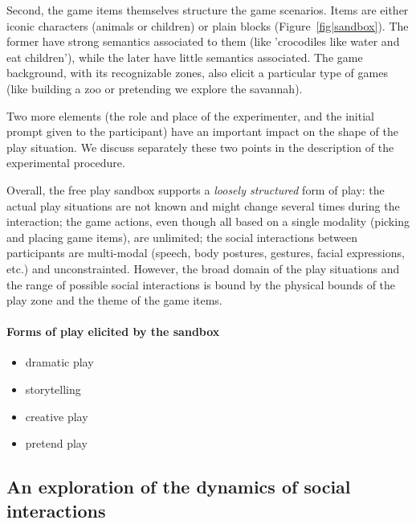 \documentclass[sigconf]{acmart}
\begin{document}
Second, the game items themselves structure the game scenarios. Items are either
iconic characters (animals or children) or plain blocks
(Figure~\ref{fig|sandbox}). The former have strong semantics associated to them
(like 'crocodiles like water and eat children'), while the later have little
semantics associated. The game background, with its recognizable zones, also
elicit a particular type of games (like building a zoo or pretending we explore
the savannah).

Two more elements (the role and place of the experimenter, and the initial
prompt given to the participant) have an important impact on the shape of the
play situation. We discuss separately these two points in the description of the
experimental procedure.

Overall, the free play sandbox supports a \emph{loosely structured} form of play: the
actual play situations are not known and might change several times during the
interaction; the game actions, even though all based on a single modality (picking and
placing game items), are unlimited; the social interactions between participants
are multi-modal (speech, body postures, gestures, facial expressions, etc.) and
unconstrainted. However, the broad domain of the play situations and the range of
possible social interactions is bound by the physical bounds of the play zone
and the theme of the game items.

\paragraph{Forms of play elicited by the sandbox}

\begin{itemize}
    \item dramatic play
    \item storytelling
    \item creative play
    \item pretend play
\end{itemize}

\subsection{An exploration of the dynamics of social interactions}
\end{document}
